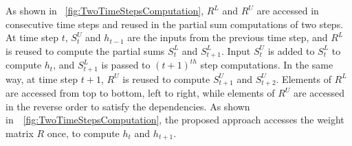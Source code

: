 \documentclass[a4paper,10pt]{article}
\begin{document}
As shown in \figurename{~\ref{fig:TwoTimeStepsComputation}}, $R^L$ and $R^U$ are accessed in consecutive time steps and reused in the partial sum computations of two steps. At time step $t$, $S_t^U$ and $h_{t-1}$ are the inputs from the previous time step, and $R^L$ is reused to compute the partial sums $S_{t}^{L}$ and $S_{t+1}^L$. Input $S_{t}^{U}$ is added to $S_{t}^{L}$ to compute $h_{t}$, and $S_{t+1}^L$ is passed to $(t{+}1)^{th}$ step computations.
In the same way, at time step $t{+}1$, $R^U$ is reused to compute $S_{t+1}^{U}$ and $S_{t+2}^{U}$. Elements of $R^L$ are accessed from top to bottom, left to right, while elements of $R^U$ are accessed in the reverse order to satisfy the dependencies. As shown in~\figurename{~\ref{fig:TwoTimeStepsComputation}}, the proposed approach accesses the weight matrix $R$ once, to compute $h_{t}$ and $h_{t+1}$. 
\end{document}
